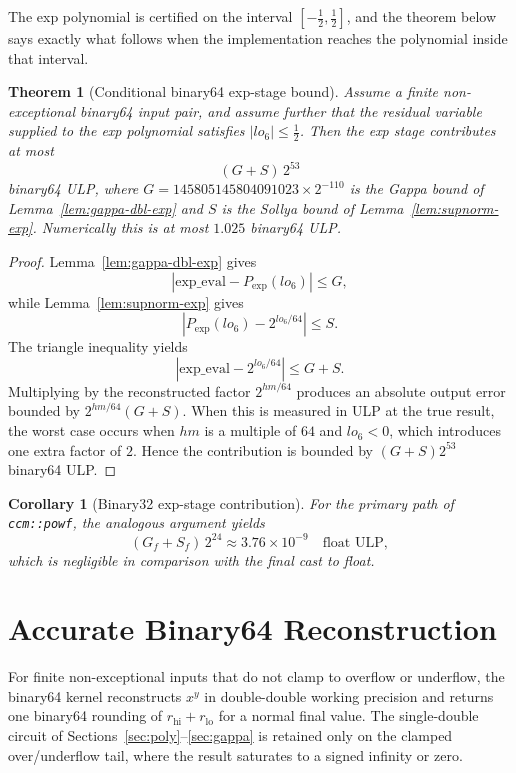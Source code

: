 \documentclass[11pt]{article}
\theoremstyle{plain}
\newtheorem{theorem}{Theorem}
\newtheorem{corollary}{Corollary}
\theoremstyle{remark}
\newcommand{\Powf}{\texttt{ccm::powf}}
\newcommand{\Gdbl}{145805145804091023 \times 2^{-110}}
\begin{document}
The exp polynomial is certified on the interval $[-\tfrac12,\tfrac12]$, and
the theorem below says exactly what follows when the implementation reaches the
polynomial inside that interval.

\begin{theorem}[Conditional binary64 exp-stage bound]
\label{thm:exp-stage}
Assume a finite non-exceptional binary64 input pair, and assume further that
the residual variable supplied to the exp polynomial satisfies
$|lo_6| \le \tfrac12$.  Then the exp stage contributes at most
\[
  (G+S)\,2^{53}
\]
binary64 ULP, where $G=\Gdbl$ is the Gappa bound of
Lemma~\ref{lem:gappa-dbl-exp} and $S$ is the Sollya bound of
Lemma~\ref{lem:supnorm-exp}.  Numerically this is at most $1.025$ binary64
ULP.
\end{theorem}

\begin{proof}
Lemma~\ref{lem:gappa-dbl-exp} gives
\[
  |\mathrm{exp\_eval} - P_{\!\exp}(lo_6)| \le G,
\]
while Lemma~\ref{lem:supnorm-exp} gives
\[
  |P_{\!\exp}(lo_6) - 2^{lo_6/64}| \le S.
\]
The triangle inequality yields
\[
  |\mathrm{exp\_eval} - 2^{lo_6/64}| \le G+S.
\]
Multiplying by the reconstructed factor $2^{hm/64}$ produces an absolute
output error bounded by $2^{hm/64}(G+S)$.  When this is measured in ULP at the
true result, the worst case occurs when $hm$ is a multiple of $64$ and
$lo_6<0$, which introduces one extra factor of $2$.  Hence the contribution is
bounded by $(G+S)2^{53}$ binary64 ULP.
\end{proof}

\begin{corollary}[Binary32 exp-stage contribution]
\label{cor:float-exp}
For the primary path of \Powf, the analogous argument yields
\[
  (G_f + S_f)\,2^{24} \approx 3.76 \times 10^{-9}
  \quad\text{float ULP},
\]
which is negligible in comparison with the final cast to float.
\end{corollary}

\section{Accurate Binary64 Reconstruction}
\label{sec:pow-accurate}

For finite non-exceptional inputs that do not clamp to overflow or underflow,
the binary64 kernel reconstructs $x^y$ in double-double working precision and
returns one binary64 rounding of $r_{\mathrm{hi}} + r_{\mathrm{lo}}$ for a normal
final value.  The
single-double circuit of Sections~\ref{sec:poly}--\ref{sec:gappa} is retained
only on the clamped over/underflow tail, where the result saturates to a signed
infinity or zero.
\end{document}
